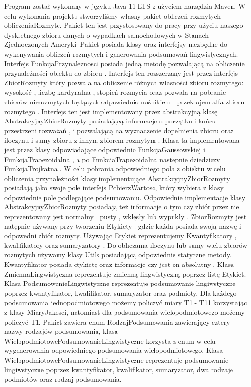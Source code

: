 \documentclass{classrep}
\begin{document}
Program został wykonany w języku Java 11 LTS z użyciem narzędzia Maven. W celu wykonania projektu stworzyliśmy własny pakiet obliczeń rozmytych - obliczeniaRozmyte. Pakiet ten jest przystosowany do pracy przy użyciu naszego dyskretnego zbioru danych o wypadkach samochodowych w Stanach Zjednoczonych Ameryki. Pakiet posiada klasy oraz interfejsy niezbędne do wykonywania obliczeń rozmytych i generowania podsumowań lingwistycznych. Interfejs FunkcjaPrzynaleznosci posiada jedną metodę pozwalającą na obliczenie przynależności obiektu do zbioru \cite{broniarska}.
Interfejs ten rozszerzany jest przez interfejs ZbiorRozmyty który pozwala na obliczenie różnych własności zbioru rozmytego: wysokość \cite{fuzzy}, liczbę kardynalna \cite{fuzzy}, stopień rozmycia \cite{niewiadomski19} oraz pozwala na pobranie zbiorów nierozmytych będących odpowiednio nośnikiem \cite{broniarska} i przekrojem alfa zbioru rozmytego \cite{broniarska}. Interfejs ten jest implementowany przez abstrakcyjną klasę AbstrakcyjnyZbiorRozmyty posiadającą informacje o początku i końcu przestrzeni rozważań \cite{fuzzy}, i pozwalającą na wyznaczenie dopełnienia zbioru oraz iloczynu i sumy zbioru z innym zbiorem rozmytym \cite{fuzzy}. Klasa ta implementowana jest przez klasy odpowiadające odpowiednio FunkcjaGaussowskiej \cite{broniarska} i FunkcjaTrapezoidalna \cite{broniarska}, a po FunkcjaTrapezoidalna nastepnie dziedziczy FunkcjaTrojkatna \cite{broniarska}. W celu pobrania odpowiedniego pola z obiektu w celu obliczenia przynależności klasy implementujące AbstrakcyjnyZbiorRozmyty posiadają jako swoje pole interfejs PobierzWartosc, który wybiera z klasy odpowiednie pole podlegające podsumowaniu. Odpowiednie implementacje klasy AbstrakcyjnyZbiorRozmyty posiadają też informacje o tym czy zbiór przez nie reprezentowany jest normalny \cite{broniarska}, pusty \cite{broniarska}, wklęsły \cite{broniarska} lub wypukły \cite{broniarska}.
ZbiorRozmyty jest natępnie używany przy tworzeniu Etykiety \cite{niewiadomski19}, gdzie każda posiada swoją nazwę i odpowedni zbiór rozmyty. Używając Etykiet reprezentujemy Kwantyfikatory \cite{niewiadomski19}, kwalifikatory \cite{niewiadomski19} oraz sumaryzatory \cite{niewiadomski19}. Do obliczania iloczynu lub sumy wielu zbiorów rozmytych używamy klasy Utils posiadającą odpowiednie statyczne metody. Kwantyfikator posiada etykietę oraz informacje czy jest on absolutny \cite{niewiadomski19}. Klasa ZmiennaLingwistyczna reprezentuje zmienną lingwistyczną poprzez listę Etykiet. Klasa PodsumowanieLingwistyczne reprezentuje podsumowanie lingiwstyczne poprzez kwantyfikator, kwalifikator, sumaryzator oraz podmioty. Dla każdego podsumowania jednopodmiotowego możemy policzyć miary T1 - T11 korzystając z klasy MiaryJakosci, natomiast dla podsumowania wielopodmiotowego możemy policzyć T1. Pakiet zawiera enum RodzajPodsumowania zawierający cztery nazwy rodzajów podsumowania, klasa WielopodmiotowePodsumowanieLingwistyczne korzysta z enum w celu wygenerowania odpowiedniego podsumowania wielopodmiotowego. Klasa WielopodmiotowePodsumowanieLingwistyczne reprezentuje podsumowanie lingiwstyczne poprzez kwantyfikator, kwalifikator, sumaryzator, dwa rodzaje podmiotów oraz rodzaj podsumowania. \\
\end{document}
